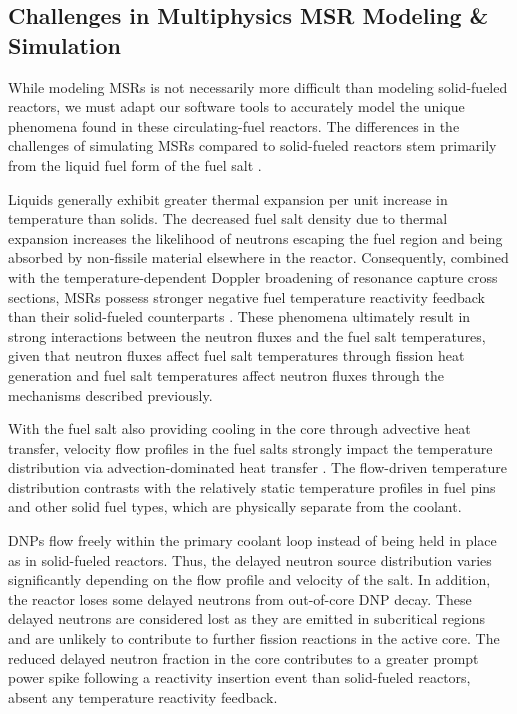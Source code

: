 \subsection{Challenges in Multiphysics \gls{MSR} Modeling \& Simulation}

While modeling \glspl{MSR} is not necessarily more difficult than modeling
solid-fueled reactors, we must adapt our software tools to accurately model the
unique phenomena found in these circulating-fuel reactors. The differences in
the challenges of simulating \glspl{MSR} compared to solid-fueled reactors stem
primarily from the liquid fuel form of the fuel salt \cite{diamond_phenomena_2018,
huff_identifying_2019}.

Liquids generally exhibit greater thermal expansion per unit increase in temperature than solids.
The decreased fuel salt density due to thermal expansion
increases the likelihood of neutrons escaping the fuel region
and being absorbed by non-fissile material elsewhere in the reactor.
Consequently, combined with the temperature-dependent Doppler broadening of
resonance capture cross sections, \glspl{MSR} possess stronger negative fuel
temperature reactivity feedback than their solid-fueled counterparts
\cite{elsheikh_safety_2013}. These
phenomena ultimately result in strong interactions between the neutron fluxes
and the fuel salt temperatures, given that neutron fluxes affect fuel salt temperatures
through fission heat generation and fuel salt temperatures affect neutron
fluxes through the mechanisms described previously.

With the fuel salt also providing cooling in the core through advective heat
transfer, velocity flow
profiles in the fuel salts strongly impact the temperature distribution via
advection-dominated heat transfer \cite{diamond_phenomena_2018}. The flow-driven
temperature distribution contrasts
with the relatively static temperature profiles in fuel pins and
other solid fuel types, which are physically separate from the coolant.

\Glspl{DNP} flow freely within the primary coolant loop instead of
being held in place as in solid-fueled reactors. Thus, the delayed neutron
source distribution varies significantly depending on the flow profile and
velocity of the salt. In addition, the reactor loses some delayed neutrons from out-of-core
\gls{DNP} decay. These delayed neutrons are considered lost as they are emitted
in subcritical regions and are unlikely to contribute to further fission
reactions in the active core. The reduced delayed neutron fraction in the core
contributes to a greater prompt power spike following a reactivity insertion
event than solid-fueled reactors, absent any temperature reactivity
feedback.

